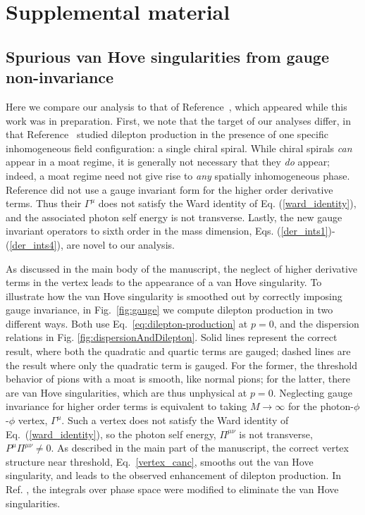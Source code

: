 \clearpage
\appendix
\onecolumngrid
\section*{Supplemental material}
\subsection{Spurious van Hove singularities from gauge non-invariance}
\label{app:supplementalMaterial}

Here we compare our analysis to that of Reference~\cite{Hayashi:2024sae}, which appeared while this work was in preparation. 
First, we note that the target of our analyses differ, in that Reference~\cite{Hayashi:2024sae} 
studied dilepton production in the presence of 
one specific inhomogeneous field configuration: 
a single chiral spiral.  While chiral spirals {\it can}
appear in a moat regime, it is generally not necessary
that they {\it do} appear; indeed, a moat regime need not give
rise to \textit{any} spatially inhomogeneous phase. 
%
Reference \cite{Hayashi:2024sae} 
did not use a gauge invariant form for the higher order derivative terms. Thus their 
$\Gamma^\mu$ does not satisfy the Ward identity of Eq. (\ref{ward_identity}), and the associated photon self energy is not transverse. 
%
Lastly, the new gauge invariant operators to sixth order in the mass dimension, Eqs. (\ref{der_ints1})-(\ref{der_ints4}), are novel to our analysis.

As discussed in the main body of the manuscript, the neglect of higher derivative terms in the vertex leads to the appearance of a van Hove singularity.
To illustrate how the van Hove singularity is smoothed out by
correctly imposing gauge invariance, in Fig.~\ref{fig:gauge} we compute dilepton production in two different ways. 
Both use Eq.~\eqref{eq:dilepton-production} 
at $p=0$, and the dispersion relations in Fig. \ref{fig:dispersionAndDilepton}.
Solid lines represent the correct result, where both the quadratic and quartic terms are gauged; dashed lines are the result where only the quadratic term is gauged. 
For the former, the threshold behavior of pions with a moat is
smooth, like normal pions; for the latter, there are
van Hove singularities, which are thus unphysical at $p=0$.
Neglecting gauge invariance for higher order terms is equivalent to taking $M \rightarrow  \infty$ for the photon-$\phi$-$\phi$ vertex, $\Gamma^\mu$.  
Such a vertex does not satisfy the Ward identity of
Eq.~(\ref{ward_identity}), so the photon
self energy, $\Pi^{\mu \nu}$ is not
transverse, $P^\mu \Pi^{\mu \nu} \neq 0$. 
As described in the main part of the manuscript, the correct vertex structure near threshold, Eq.~\eqref{vertex_canc}, smooths out the van Hove singularity, and leads to the observed enhancement of dilepton production.
%
In Ref. \cite{Hayashi:2024sae}, the integrals over phase space
were modified to eliminate the van Hove singularities.


